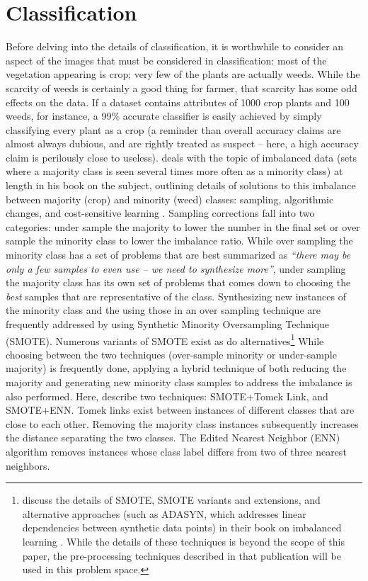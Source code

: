 \documentclass[letterpaper]{article}
\begin{document}
{\section{Classification}
Before delving into the details of classification, it is worthwhile to consider an aspect of the images that must be considered in classification: most of the vegetation appearing is crop; very few of the plants are actually weeds. While the scarcity of weeds is certainly a good thing for farmer, that scarcity has some odd effects on the data. If a dataset contains attributes of 1000 crop plants and 100 weeds, for instance, a 99\% accurate classifier is easily achieved by simply classifying every plant as a crop (a reminder than overall accuracy claims are almost always dubious, and are rightly treated as suspect -- here, a high accuracy claim is perilously close to useless). \citeauthor{Fernandez2018-fw}  deals with the topic of imbalanced data (sets where a majority class is seen several times more often as a minority class) at length in his book on the subject, outlining details of solutions to this imbalance between majority (crop) and minority (weed) classes: sampling, algorithmic changes, and cost-sensitive learning \parencite{Fernandez2018-fw}. Sampling corrections fall into two categories: under sample the majority to lower the number in the final set or over sample the minority class to lower the imbalance ratio. While over sampling the minority class has a set of problems that are best summarized as \textit{``there may be only a few samples to even use -- we need to synthesize more''}, under sampling the majority class has its own set of problems that comes down to choosing the \textit{best} samples that are representative of the class. Synthesizing new instances of the minority class and the using those in an over sampling technique are frequently addressed by using Synthetic Minority Oversampling Technique (SMOTE). Numerous variants of SMOTE exist as do alternatives\footnote{\citeauthor{Fernandez2018-fw} discuss the details of SMOTE, SMOTE variants and extensions, and alternative approaches (such as ADASYN, which addresses linear dependencies between synthetic data points) in their book on imbalanced learning \parencite[p.~101]{Fernandez2018-fw}. While the details of these techniques is beyond the scope of this paper, the pre-processing techniques described in that publication will be used in this problem space.} While choosing between the two techniques (over-sample minority or under-sample majority) is frequently done, applying a hybrid technique of both reducing the majority and generating new minority class samples to address the imbalance is also performed. Here, \citeauthor{Fernandez2018-fw} describe two techniques: SMOTE+Tomek Link, and SMOTE+ENN. Tomek links exist between instances of different classes that are close to each other. Removing the majority class instances subsequently increases the distance separating the two classes. The Edited Nearest Neighbor (ENN) algorithm removes instances whose class label differs from two of three nearest neighbors.
}
\end{document}
